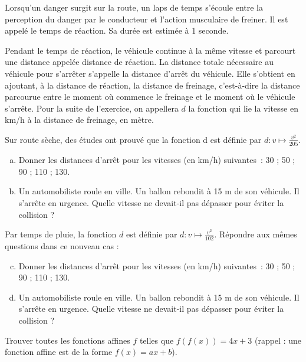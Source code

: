 \documentclass[12pt]{article}
\begin{document}
  \begin{exercice}
    Lorsqu'un danger surgit sur la route, un laps de temps s'écoule entre la
    perception du danger par le conducteur et l'action musculaire de
    freiner. Il est appelé le temps de réaction. Sa durée est estimée à 1
    seconde.

    Pendant le temps de réaction, le véhicule continue à la même vitesse et
    parcourt une distance appelée distance de réaction.  La distance totale
    nécessaire au véhicule pour s'arrêter s'appelle la distance d'arrêt du
    véhicule. Elle s'obtient en ajoutant, à la distance de réaction, la
    distance de freinage, c'est-à-dire la distance parcourue entre le moment
    où commence le freinage et le moment où le véhicule s'arrête.  Pour la
    suite de l'exercice, on appellera $d$ la fonction qui lie la vitesse en km/h
    à la distance de freinage, en mètre.

    Sur route sèche, des études ont prouvé que la fonction d est définie par
    $d:v\mapsto \frac{v^2}{205}$.

    \begin{enumerate}[(a)]
      \item Donner les distances d’arrêt pour les vitesses (en km/h) suivantes~: 30 ; 50 ; 90 ; 110 ; 130.
      \item Un automobiliste roule en ville. Un ballon rebondit à 15 m de son véhicule. Il s’arrête en urgence.  Quelle vitesse ne devait-il pas dépasser pour éviter la collision ?
    \end{enumerate}

    \noindent Par temps de pluie, la fonction $d$ est définie par $d:v\mapsto
    \frac{v^2}{102}$. Répondre aux mêmes questions dans ce nouveau cas :

    \begin{enumerate}[(a)]
        \setcounter{enumi}{2}
      \item Donner les distances d’arrêt pour les vitesses (en km/h) suivantes~: 30 ; 50 ; 90 ; 110 ; 130.
      \item Un automobiliste roule en ville. Un ballon rebondit à 15 m de son véhicule. Il s’arrête en urgence.  Quelle vitesse ne devait-il pas dépasser pour éviter la collision ?
    \end{enumerate}

  \end{exercice}

  \begin{exercice}[Bonus] Trouver toutes les fonctions affines $f$ telles que
    $f\left(f\left(x\right)\right)=4x+3$ (rappel : une fonction affine est de
    la forme $f(x) = ax+b$).
  \end{exercice}
\end{document}
